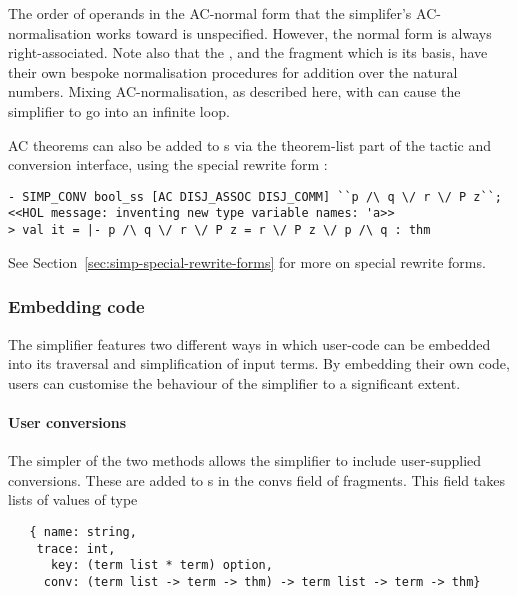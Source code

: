The order of operands in the AC-normal form that the simplifer's
AC-normalisation works toward is unspecified.  However, the normal
form is always right-associated.  Note also that the 
\simpset, and the  fragment which is its basis, have
their own bespoke normalisation procedures for addition over the
natural numbers.  Mixing AC-normalisation, as described here, with
 can cause the simplifier to go into an infinite loop.

AC theorems can also be added to \simpset{}s via the theorem-list part
of the tactic and conversion interface, using the special rewrite form
:
\begin{session}
\begin{verbatim}
- SIMP_CONV bool_ss [AC DISJ_ASSOC DISJ_COMM] ``p /\ q \/ r \/ P z``;
<<HOL message: inventing new type variable names: 'a>>
> val it = |- p /\ q \/ r \/ P z = r \/ P z \/ p /\ q : thm
\end{verbatim}
\end{session}
See Section~\ref{sec:simp-special-rewrite-forms} for more on special
rewrite forms.

\subsubsection{Embedding code}
\label{sec:simp-embedding-code}

The simplifier features two different ways in which user-code can be
embedded into its traversal and simplification of input terms.  By
embedding their own code, users can customise the behaviour of the
simplifier to a significant extent.

\paragraph{User conversions}
The simpler of the two methods allows the simplifier to include
user-supplied conversions.  These are added to \simpset{}s in the
{convs} field of \simpset{} fragments.  This field takes lists of
values of type
\begin{hol}
\begin{verbatim}
   { name: string,
    trace: int,
      key: (term list * term) option,
     conv: (term list -> term -> thm) -> term list -> term -> thm}
\end{verbatim}
\end{hol}

